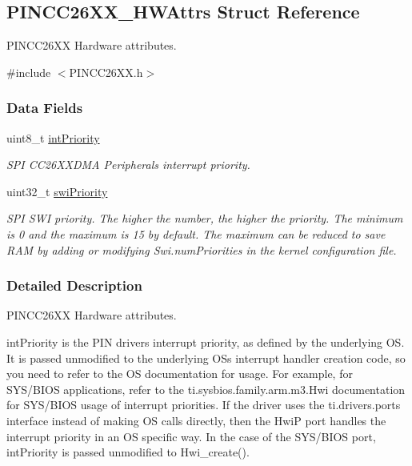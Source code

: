 \subsection{P\+I\+N\+C\+C26\+X\+X\+\_\+\+H\+W\+Attrs Struct Reference}
\label{struct_p_i_n_c_c26_x_x___h_w_attrs}


P\+I\+N\+C\+C26\+X\+X Hardware attributes.  




{\ttfamily \#include $<$P\+I\+N\+C\+C26\+X\+X.\+h$>$}

\subsubsection*{Data Fields}
\begin{DoxyCompactItemize}
\item 
uint8\+\_\+t \hyperlink{struct_p_i_n_c_c26_x_x___h_w_attrs_a6e4e12f10aa905a5e6a7cf566c1dfe44}{int\+Priority}
\begin{DoxyCompactList}\small\item\em S\+P\+I C\+C26\+X\+X\+D\+M\+A Peripheral\textquotesingle{}s interrupt priority. \end{DoxyCompactList}\item 
uint32\+\_\+t \hyperlink{struct_p_i_n_c_c26_x_x___h_w_attrs_af7aa538ec5ac9d067fd7eb9fce31f0f9}{swi\+Priority}
\begin{DoxyCompactList}\small\item\em S\+P\+I S\+W\+I priority. The higher the number, the higher the priority. The minimum is 0 and the maximum is 15 by default. The maximum can be reduced to save R\+A\+M by adding or modifying Swi.\+num\+Priorities in the kernel configuration file. \end{DoxyCompactList}\end{DoxyCompactItemize}


\subsubsection{Detailed Description}
P\+I\+N\+C\+C26\+X\+X Hardware attributes. 

int\+Priority is the P\+I\+N driver\textquotesingle{}s interrupt priority, as defined by the underlying O\+S. It is passed unmodified to the underlying O\+S\textquotesingle{}s interrupt handler creation code, so you need to refer to the O\+S documentation for usage. For example, for S\+Y\+S/\+B\+I\+O\+S applications, refer to the ti.\+sysbios.\+family.\+arm.\+m3.\+Hwi documentation for S\+Y\+S/\+B\+I\+O\+S usage of interrupt priorities. If the driver uses the ti.\+drivers.\+ports interface instead of making O\+S calls directly, then the Hwi\+P port handles the interrupt priority in an O\+S specific way. In the case of the S\+Y\+S/\+B\+I\+O\+S port, int\+Priority is passed unmodified to Hwi\+\_\+create().

